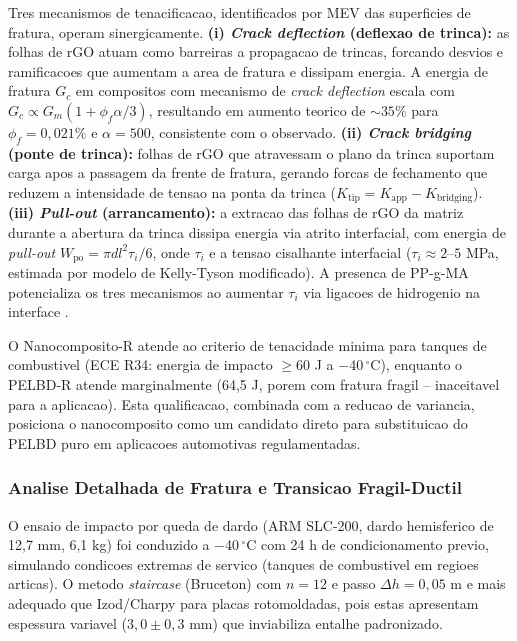 \documentclass[11pt,a4paper,oneside]{article}
\begin{document}
Tres mecanismos de tenacificacao, identificados por MEV das superficies de fratura, operam sinergicamente. {\bfseries (i) \textit{Crack deflection} (deflexao de trinca):} as folhas de rGO atuam como barreiras a propagacao de trincas, forcando desvios e ramificacoes que aumentam a area de fratura e dissipam energia. A energia de fratura $G_c$ em compositos com mecanismo de \textit{crack deflection} escala com $G_c{\propto}G_m(1{+}\phi_f\alpha/3)$, resultando em aumento teorico de ${\sim}35\%$ para $\phi_f{=}0{,}021\%$ e $\alpha{=}500$, consistente com o observado. {\bfseries (ii) \textit{Crack bridging} (ponte de trinca):} folhas de rGO que atravessam o plano da trinca suportam carga apos a passagem da frente de fratura, gerando forcas de fechamento que reduzem a intensidade de tensao na ponta da trinca ($K_{\text{tip}}{=}K_{\text{app}}{-}K_{\text{bridging}}$). {\bfseries (iii) \textit{Pull-out} (arrancamento):} a extracao das folhas de rGO da matriz durante a abertura da trinca dissipa energia via atrito interfacial, com energia de \textit{pull-out} $W_{\text{po}}{=}\pi d l^2 \tau_i/6$, onde $\tau_i$ e a tensao cisalhante interfacial ($\tau_i{\approx}2$--$5$ MPa, estimada por modelo de Kelly-Tyson modificado). A presenca de PP-g-MA potencializa os tres mecanismos ao aumentar $\tau_i$ via ligacoes de hidrogenio na interface \cite{Rafiee2010, Young2012}.

O Nanocomposito-R atende ao criterio de tenacidade minima para tanques de combustivel (ECE R34: energia de impacto $\ge60$ J a $-$40$\,^{\circ}$C), enquanto o PELBD-R atende marginalmente (64,5 J, porem com fratura fragil -- inaceitavel para a aplicacao). Esta qualificacao, combinada com a reducao de variancia, posiciona o nanocomposito como um candidato direto para substituicao do PELBD puro em aplicacoes automotivas regulamentadas.

\subsubsection{Analise Detalhada de Fratura e Transicao Fragil-Ductil}

O ensaio de impacto por queda de dardo (ARM SLC-200, dardo hemisferico de 12,7 mm, 6,1 kg) foi conduzido a $-$40$\,^{\circ}$C com 24 h de condicionamento previo, simulando condicoes extremas de servico (tanques de combustivel em regioes articas). O metodo \textit{staircase} (Bruceton) com $n{=}12$ e passo $\Delta h{=}0{,}05$ m e mais adequado que Izod/Charpy para placas rotomoldadas, pois estas apresentam espessura variavel ($3{,}0{\pm}0{,}3$ mm) que inviabiliza entalhe padronizado.
\end{document}
